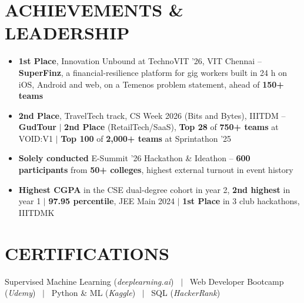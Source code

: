 \documentclass[a4paper,10pt]{article}
\begin{document}
\section*{ACHIEVEMENTS \& LEADERSHIP}
\begin{itemize}
    \item \textbf{1st Place}, Innovation Unbound at TechnoVIT '26, VIT Chennai -- \textbf{SuperFinz}, a financial-resilience platform for gig workers built in 24 h on iOS, Android and web, on a Temenos problem statement, ahead of \textbf{150+ teams}
    \item \textbf{2nd Place}, TravelTech track, CS Week 2026 (Bits and Bytes), IIITDM -- \textbf{GudTour} $|$ \textbf{2nd Place} (RetailTech/SaaS), \textbf{Top 28} of \textbf{750+ teams} at VOID:V1 $|$ \textbf{Top 100} of \textbf{2,000+ teams} at Sprintathon '25
    \item \textbf{Solely conducted} E-Summit '26 Hackathon \& Ideathon -- \textbf{600 participants} from \textbf{50+ colleges}, highest external turnout in event history
    \item \textbf{Highest CGPA} in the CSE dual-degree cohort in year 2, \textbf{2nd highest} in year 1 $|$ \textbf{97.95 percentile}, JEE Main 2024 $|$ \textbf{1st Place} in 3 club hackathons, IIITDMK
\end{itemize}

\section*{CERTIFICATIONS}
Supervised Machine Learning (\textit{deeplearning.ai}) \ $|$ \
Web Developer Bootcamp (\textit{Udemy}) \ $|$ \
Python \& ML (\textit{Kaggle}) \ $|$ \
SQL (\textit{HackerRank})
\end{document}

